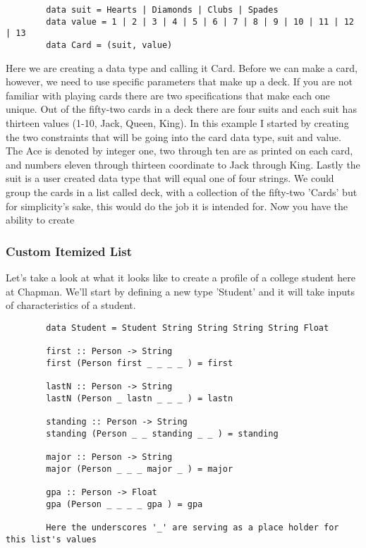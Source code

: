 \documentclass{article}
\begin{document}
    \begin{lstlisting}
        data suit = Hearts | Diamonds | Clubs | Spades 
        data value = 1 | 2 | 3 | 4 | 5 | 6 | 7 | 8 | 9 | 10 | 11 | 12 | 13  
        data Card = (suit, value)
    \end{lstlisting}
    
    Here we are creating a data type and calling it Card. Before we can make a card, however, we need to use specific parameters that make up a deck. If you are not familiar with playing cards there are two specifications that make each one unique. Out of the fifty-two cards in a deck there are four suits and each suit has thirteen values (1-10, Jack, Queen, King). In this example I started by creating the two constraints that will be going into the card data type, suit and value. The Ace is denoted by integer one, two through ten are as printed on each card, and numbers eleven through thirteen coordinate to Jack through King. Lastly the suit is a user created data type that will equal one of four strings. We could group the cards in a list called deck, with a collection of the fifty-two 'Cards' but for simplicity's sake, this would do the job it is intended for. Now you have the ability to create
    
    \subsubsection{Custom Itemized List}
    Let's take a look at what it looks like to create a profile of a college student here at Chapman. We'll start by defining a new type 'Student' and it will take inputs of characteristics of a student.
    
    \medskip
    \begin{lstlisting}
        data Student = Student String String String String Float
        
        first :: Person -> String  
        first (Person first _ _ _ _ ) = first
          
        lastN :: Person -> String  
        lastN (Person _ lastn _ _ _ ) = lastn
          
        standing :: Person -> String  
        standing (Person _ _ standing _ _ ) = standing
          
        major :: Person -> String  
        major (Person _ _ _ major _ ) = major
          
        gpa :: Person -> Float  
        gpa (Person _ _ _ _ gpa ) = gpa
        
        Here the underscores '_' are serving as a place holder for this list's values
    \end{lstlisting}
    
\end{document}
